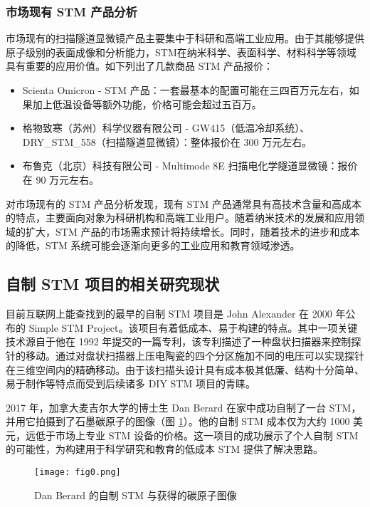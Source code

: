 \documentclass{article}
\begin{document}
\begin{spacing}{1.5}
	\subsubsection[市场现有 STM 产品分析]{市场现有 STM 产品分析}
	市场现有的扫描隧道显微镜产品主要集中于科研和高端工业应用。由于其能够提供原子级别的表面成像和分析能力，STM在纳米科学、表面科学、材料科学等领域具有重要的应用价值。如下列出了几款商品 STM 产品报价：
	\begin{itemize}
		\item Scienta Omicron - STM 产品：一套最基本的配置可能在三四百万元左右，如果加上低温设备等额外功能，价格可能会超过五百万。
		\item 格物致寒（苏州）科学仪器有限公司 - GW415（低温冷却系统）、DRY\_STM\_558（扫描隧道显微镜）：整体报价在 300 万元左右。
		\item 布鲁克（北京）科技有限公司 - Multimode 8E 扫描电化学隧道显微镜：报价在 90 万元左右。
	\end{itemize}
	
	
	对市场现有的 STM 产品分析发现，现有 STM 产品通常具有高技术含量和高成本的特点，主要面向对象为科研机构和高端工业用户。随着纳米技术的发展和应用领域的扩大，STM 产品的市场需求预计将持续增长。同时，随着技术的进步和成本的降低，STM 系统可能会逐渐向更多的工业应用和教育领域渗透。
	
	
	
	\subsection{自制 STM 项目的相关研究现状}
	目前互联网上能查找到的最早的自制 STM 项目是 John Alexander 在 2000 年公布的 Simple STM Project\cite{ref12}。该项目有着低成本、易于构建的特点。其中一项关键技术源自于他在 1992 年提交的一篇专利，该专利描述了一种盘状扫描器来控制探针的移动。通过对盘状扫描器上压电陶瓷的四个分区施加不同的电压可以实现探针在三维空间内的精确移动\cite{ref13}。由于该扫描头设计具有成本极其低廉、结构十分简单、易于制作等特点而受到后续诸多 DIY STM 项目的青睐。
	
	2017 年，加拿大麦吉尔大学的博士生 Dan Berard 在家中成功自制了一台 STM，并用它拍摄到了石墨碳原子的图像（图 \ref{fig0}）\cite{ref11}。他的自制 STM 成本仅为大约 1000 美元，远低于市场上专业 STM 设备的价格。这一项目的成功展示了个人自制 STM 的可能性，为构建用于科学研究和教育的低成本 STM 提供了解决思路。
	
	\begin{figure}[!htbp]
		\centering
		\texttt{[image: fig0.png]}
		\caption{Dan Berard 的自制 STM 与获得的碳原子图像}
		\label{fig0}
	\end{figure}
	

\end{spacing}
\end{document}
